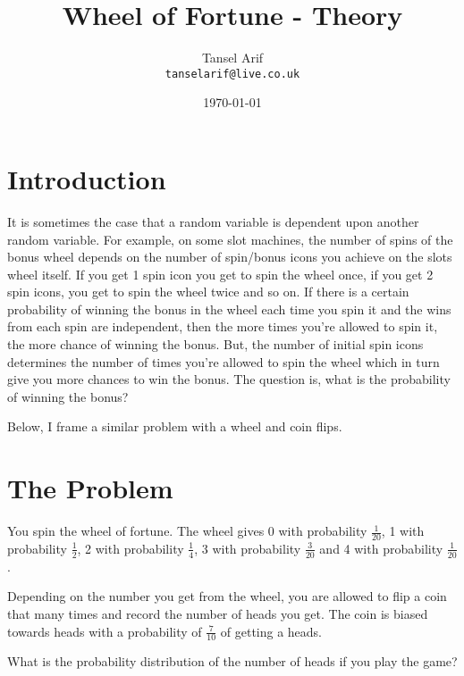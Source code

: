 \documentclass{article}
\title{Wheel of Fortune - Theory} %
\author{Tansel Arif\\ \texttt{tanselarif@live.co.uk}} %
\date{\today} %
\begin{document}
\maketitle %


\section*{Introduction} %

\begin{flushleft}
It is sometimes the case that a random variable is dependent upon another random variable. For example, on some slot machines, the number of spins of the bonus wheel depends on the number of spin/bonus icons you achieve on the slots wheel itself. If you get 1 spin icon you get to spin the wheel once, if you get 2 spin icons, you get to spin the wheel twice and so on. If there is a certain probability of winning the bonus in the wheel each time you spin it and the wins from each spin are independent, then the more times you're allowed to spin it, the more chance of winning the bonus. But, the number of initial spin icons determines the number of times you're allowed to spin the wheel which in turn give you more chances to win the bonus. The question is, what is the probability of winning the bonus?\newline

Below, I frame a similar problem with a wheel and coin flips.
\end{flushleft}

\section{The Problem} %

\begin{flushleft}
You spin the wheel of fortune. The wheel gives $0$ with probability $\frac{1}{20}$, 1 with probability $\frac{1}{2}$, 2 with probability $\frac{1}{4}$, 3 with probability $\frac{3}{20}$ and 4 with probability $\frac{1}{20}$.\newline

Depending on the number you get from the wheel, you are allowed to flip a coin that many times and record the number of heads you get. The coin is biased towards heads with a probability of $\frac{7}{10}$ of getting a heads.\newline

What is the probability distribution of the number of heads if you play the game?
\end{flushleft}
\end{document}
